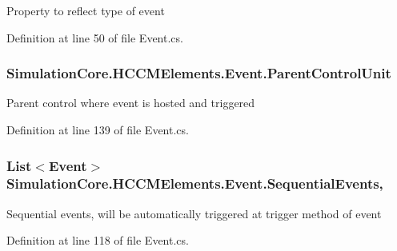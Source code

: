 Property to reflect type of event 



Definition at line 50 of file Event.\+cs.

\subsubsection[{\texorpdfstring{Parent\+Control\+Unit}{ParentControlUnit}}]{ Simulation\+Core.\+H\+C\+C\+M\+Elements.\+Event.\+Parent\+Control\+Unit\hspace{0.3cm}{\ttfamily [get]}}\hypertarget{class_simulation_core_1_1_h_c_c_m_elements_1_1_event_a82b2a9553b21254fd44aea403764d5a5}{}\label{class_simulation_core_1_1_h_c_c_m_elements_1_1_event_a82b2a9553b21254fd44aea403764d5a5}


Parent control where event is hosted and triggered 



Definition at line 139 of file Event.\+cs.

\subsubsection[{\texorpdfstring{Sequential\+Events}{SequentialEvents}}]{\setlength{\rightskip}{0pt plus 5cm}List$<${\bf Event}$>$ Simulation\+Core.\+H\+C\+C\+M\+Elements.\+Event.\+Sequential\+Events\hspace{0.3cm}{\ttfamily [get]}, {\ttfamily [set]}}\hypertarget{class_simulation_core_1_1_h_c_c_m_elements_1_1_event_a0eca4e693d5a4c68d0cc27ae24e45103}{}\label{class_simulation_core_1_1_h_c_c_m_elements_1_1_event_a0eca4e693d5a4c68d0cc27ae24e45103}


Sequential events, will be automatically triggered at trigger method of event 



Definition at line 118 of file Event.\+cs.

